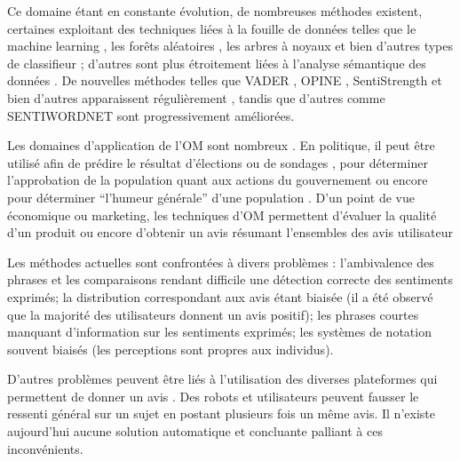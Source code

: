 \documentclass[8pt]{article}
\begin{document}
\begin{multicols}{2}
\par Ce domaine étant en constante évolution, de nombreuses méthodes existent, certaines exploitant des techniques liées à la fouille de données telles que le machine learning \cite{ressource28} \cite{ressource1}, les forêts aléatoires \cite{ressource18}, les arbres à noyaux \cite{ressource30} \cite{ressource17} et bien d’autres types de classifieur \cite{ressource4} \cite{ressource9} \cite{ressource10} \cite{ressource15}; d’autres sont plus étroitement liées à l’analyse sémantique des données \cite{ressource16} \cite{ressource11} \cite{ressource12} \cite{ressource7}.
De nouvelles méthodes telles que VADER \cite{ressource26}, OPINE \cite{ressource9}, SentiStrength \cite{ressource22} et bien d’autres apparaissent régulièrement \cite{ressource17} \cite{ressource16} \cite{ressource13}, tandis que d’autres comme SENTIWORDNET \cite{ressource12} \cite{ressource7} sont progressivement améliorées.

Les domaines d’application de l’OM sont nombreux \cite{ressource20}. En politique, il peut être utilisé afin de prédire le résultat d'élections ou de sondages \cite{ressource11} \cite{ressource14}, pour déterminer l’approbation de la population quant aux actions du gouvernement \cite{ressource14} ou encore pour déterminer “l’humeur générale” d’une population \cite{ressource27} \cite{ressource25} \cite{ressource24}.
D’un point de vue économique ou marketing, les techniques d’OM permettent d’évaluer la qualité d’un produit \cite{ressource18} \cite{ressource9} \cite{ressource8} ou encore d’obtenir un avis résumant l’ensembles des avis utilisateur \cite{ressource3}

\par Les méthodes actuelles sont confrontées à divers problèmes \cite{ressource8}: l’ambivalence des phrases et les comparaisons rendant difficile une détection correcte des sentiments exprimés; la distribution correspondant aux avis étant biaisée (il a été observé que la majorité des utilisateurs donnent un avis positif); les phrases courtes manquant d’information sur les sentiments exprimés; les systèmes de notation souvent biaisés (les perceptions sont propres aux individus).
\end{multicols}
\par D’autres problèmes peuvent être liés à l’utilisation des diverses plateformes qui permettent de donner un avis \cite{ressource5}. Des robots et utilisateurs peuvent fausser le ressenti général sur un sujet en postant plusieurs fois un même avis. Il n’existe aujourd’hui aucune solution automatique et concluante palliant à ces inconvénients.
\end{document}
